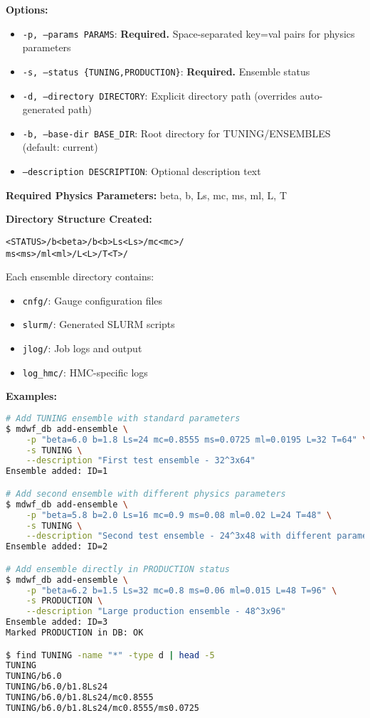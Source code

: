\documentclass{article}
\begin{document}
\textbf{Options:}
\begin{itemize}
\item \texttt{-p, --params PARAMS}: \textbf{Required.} Space-separated key=val pairs for physics parameters
\item \texttt{-s, --status \{TUNING,PRODUCTION\}}: \textbf{Required.} Ensemble status
\item \texttt{-d, --directory DIRECTORY}: Explicit directory path (overrides auto-generated path)
\item \texttt{-b, --base-dir BASE\_DIR}: Root directory for TUNING/ENSEMBLES (default: current)
\item \texttt{--description DESCRIPTION}: Optional description text
\end{itemize}

\textbf{Required Physics Parameters:}
beta, b, Ls, mc, ms, ml, L, T

\textbf{Directory Structure Created:}

\texttt{<STATUS>/b<beta>/b<b>Ls<Ls>/mc<mc>/}\\
\texttt{ms<ms>/ml<ml>/L<L>/T<T>/}

Each ensemble directory contains:
\begin{itemize}
\item \texttt{cnfg/}: Gauge configuration files
\item \texttt{slurm/}: Generated SLURM scripts  
\item \texttt{jlog/}: Job logs and output
\item \texttt{log\_hmc/}: HMC-specific logs
\end{itemize}

\textbf{Examples:}
\begin{lstlisting}[language=bash]
# Add TUNING ensemble with standard parameters
$ mdwf_db add-ensemble \
    -p "beta=6.0 b=1.8 Ls=24 mc=0.8555 ms=0.0725 ml=0.0195 L=32 T=64" \
    -s TUNING \
    --description "First test ensemble - 32^3x64"
Ensemble added: ID=1

# Add second ensemble with different physics parameters
$ mdwf_db add-ensemble \
    -p "beta=5.8 b=2.0 Ls=16 mc=0.9 ms=0.08 ml=0.02 L=24 T=48" \
    -s TUNING \
    --description "Second test ensemble - 24^3x48 with different parameters"
Ensemble added: ID=2

# Add ensemble directly in PRODUCTION status
$ mdwf_db add-ensemble \
    -p "beta=6.2 b=1.5 Ls=32 mc=0.8 ms=0.06 ml=0.015 L=48 T=96" \
    -s PRODUCTION \
    --description "Large production ensemble - 48^3x96"
Ensemble added: ID=3
Marked PRODUCTION in DB: OK

$ find TUNING -name "*" -type d | head -5
TUNING
TUNING/b6.0
TUNING/b6.0/b1.8Ls24
TUNING/b6.0/b1.8Ls24/mc0.8555
TUNING/b6.0/b1.8Ls24/mc0.8555/ms0.0725
\end{lstlisting}
\end{document}
